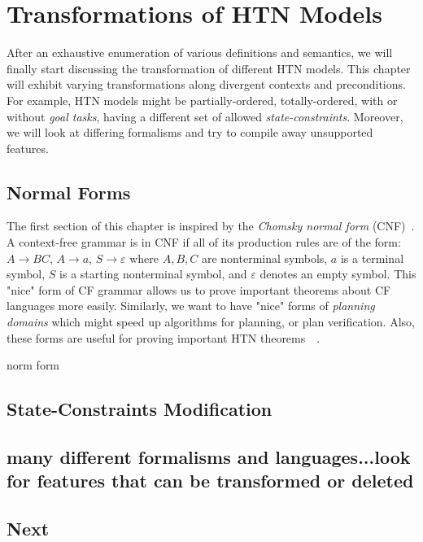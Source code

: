 \chapter{Transformations of {HTN} {M}odels}

\medskip\noindent
After an exhaustive enumeration of various definitions and semantics, we will finally start discussing the transformation of different HTN models. This chapter will exhibit varying transformations along divergent contexts and preconditions. For example, HTN models might be partially-ordered, totally-ordered, with or without \emph{goal tasks}, having a different set of allowed \emph{state-constraints}. Moreover, we will look at differing formalisms and try to compile away unsupported features.

\section{Normal Forms}

\medskip\noindent
The first section of this chapter is inspired by the \emph{Chomsky normal form} (CNF)~\cite{chytil}. A context-free grammar is in CNF if all of its production rules are of the form: $A \rightarrow BC$, $A \rightarrow a$, $S \rightarrow \varepsilon$ where $A, B, C$ are nonterminal symbols, $a$ is a terminal symbol, $S$ is a starting nonterminal symbol, and $\varepsilon$ denotes an empty symbol. This "nice" form of CF grammar allows us to prove important theorems about CF languages more easily. Similarly, we want to have "nice" forms of \emph{planning domains} which might speed up algorithms for planning, or plan verification. Also, these forms are useful for proving important HTN theorems~\cite{langclassification}~\cite{cmyk}.

\begin{defn}\label{def04:14}
norm form
\end{defn}


\section{State-Constraints Modification}

\section{many different formalisms and languages...look for features that can be transformed or deleted}
\cite{hddl}

\section{Next}
